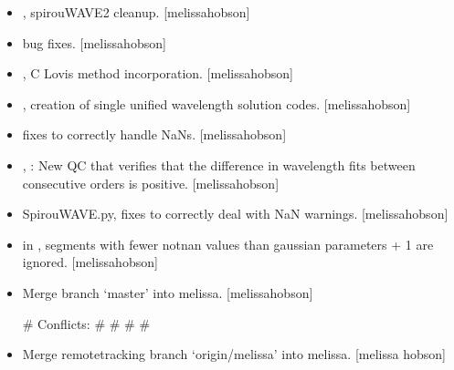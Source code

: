 \documentclass[a4paper,10pt,english]{report}
\begin{document}
\begin{itemize}
\item {} 
, spirouWAVE2 \sphinxhyphen{} cleanup. {[}melissa\sphinxhyphen{}hobson{]}

\item {} 
 \sphinxhyphen{} bug fixes. {[}melissa\sphinxhyphen{}hobson{]}

\item {} 
,  \sphinxhyphen{} C Lovis method incorporation.
{[}melissa\sphinxhyphen{}hobson{]}

\item {} 
,  \sphinxhyphen{} creation of single unified
wavelength solution codes. {[}melissa\sphinxhyphen{}hobson{]}

\item {} 
 \sphinxhyphen{} fixes to correctly handle NaNs.
{[}melissa\sphinxhyphen{}hobson{]}

\item {} 
, : New QC that verifies that the
difference in wavelength fits between consecutive orders is positive.
{[}melissa\sphinxhyphen{}hobson{]}

\item {} 
SpirouWAVE.py,  \sphinxhyphen{} fixes to correctly deal with NaN
warnings. {[}melissa\sphinxhyphen{}hobson{]}

\item {} 
 \sphinxhyphen{} in , segments with fewer not\sphinxhyphen{}nan
values than gaussian parameters + 1 are ignored. {[}melissa\sphinxhyphen{}hobson{]}

\item {} 
Merge branch ‘master’ into melissa. {[}melissa\sphinxhyphen{}hobson{]}

\# Conflicts:
\#    
\#    
\#    
\#    

\item {} 
Merge remote\sphinxhyphen{}tracking branch ‘origin/melissa’ into melissa. {[}melissa\sphinxhyphen{}
hobson{]}


\end{itemize}
\end{document}
